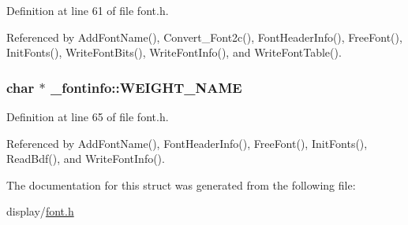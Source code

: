 Definition at line 61 of file font.\-h.



Referenced by Add\-Font\-Name(), Convert\-\_\-\-Font2c(), Font\-Header\-Info(), Free\-Font(), Init\-Fonts(), Write\-Font\-Bits(), Write\-Font\-Info(), and Write\-Font\-Table().

\hypertarget{struct__fontinfo_a2f528cb5c1bceb6afd91ad138472d071}{
\subsubsection[{W\-E\-I\-G\-H\-T\-\_\-\-N\-A\-M\-E}]{\setlength{\rightskip}{0pt plus 5cm}char $\ast$ \-\_\-fontinfo\-::\-W\-E\-I\-G\-H\-T\-\_\-\-N\-A\-M\-E}}\label{struct__fontinfo_a2f528cb5c1bceb6afd91ad138472d071}


Definition at line 65 of file font.\-h.



Referenced by Add\-Font\-Name(), Font\-Header\-Info(), Free\-Font(), Init\-Fonts(), Read\-Bdf(), and Write\-Font\-Info().



The documentation for this struct was generated from the following file\-:\begin{DoxyCompactItemize}
\item 
display/\hyperlink{display_2font_8h}{font.\-h}\end{DoxyCompactItemize}
